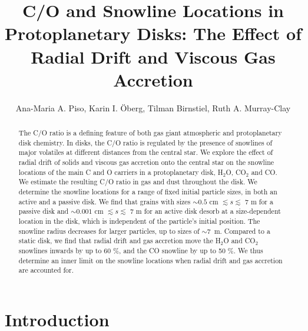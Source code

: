 \documentclass[apj]{emulateapj}
\begin{document}


\title{C/O and Snowline Locations in Protoplanetary Disks: The Effect of Radial Drift and Viscous Gas Accretion}

\author{Ana-Maria A. Piso, Karin I. \"Oberg, Tilman Birnstiel, Ruth A. Murray-Clay}


\begin{abstract}
The C/O ratio is a defining feature of both gas giant atmospheric and protoplanetary disk chemistry. In disks, the C/O ratio is regulated by the presence of snowlines of major volatiles at different distances from the central star.
We explore the effect of radial drift of solids and viscous gas accretion onto the central star on the snowline locations of the main C and O carriers in a protoplanetary disk, H$_2$O, CO$_2$ and CO.  We estimate the resulting C/O ratio in gas and dust throughout the disk. We determine the snowline locations for a range of fixed initial particle sizes, in both an active and a passive disk. We find that grains with sizes $\sim$$0.5$ cm $\lesssim s \lesssim$ 7 m for a passive disk and $\sim$$0.001$ cm $\lesssim s \lesssim$ 7 m for an active disk desorb %
at a %
size-dependent location in the disk, which is independent %
of the particle's initial position. The snowline radius decreases for larger particles, up to sizes of $\sim$7~m. %
Compared to a static disk, we find that radial drift and gas accretion move the H$_2$O and CO$_2$ snowlines inwards by up to 60 \%, and the CO snowline by up to 50 \%. We thus determine an inner limit on the snowline locations when radial drift and gas accretion are accounted for. %
\end{abstract}

\section{Introduction}
\end{document}
